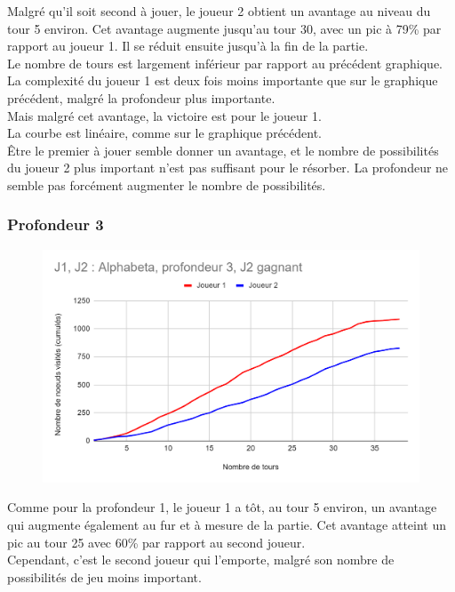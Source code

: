 \documentclass[12pt]{article}
\begin{document}
Malgré qu’il soit second à jouer, le joueur 2 obtient un avantage au niveau du tour 5 environ. Cet avantage augmente jusqu’au tour 30, avec un pic à 79\% par rapport au joueur 1. Il se réduit ensuite jusqu’à la fin de la partie.\\
Le nombre de tours est largement inférieur par rapport au précédent graphique. La complexité du joueur 1 est deux fois moins importante que sur le graphique précédent, malgré la profondeur plus importante.\\
Mais malgré cet avantage, la victoire est pour le joueur 1.\\

La courbe est linéaire, comme sur le graphique précédent.\\
Être le premier à jouer semble donner un avantage, et le nombre de possibilités du joueur 2 plus important n’est pas suffisant pour le résorber. La profondeur ne semble pas forcément augmenter le nombre de possibilités.
\newpage
\subsubsection{Profondeur 3}

\begin{figure}[!h]
   \includegraphics[width=\textwidth]{prof3alphabeta.png}
\end{figure}

Comme pour la profondeur 1, le joueur 1 a tôt, au tour 5 environ, un avantage qui augmente également au fur et à mesure de la partie. Cet avantage atteint un pic au tour 25 avec 60\% par rapport au second joueur.\\
Cependant, c'est le second joueur qui l'emporte, malgré son nombre de possibilités de jeu moins important.\\
\end{document}
